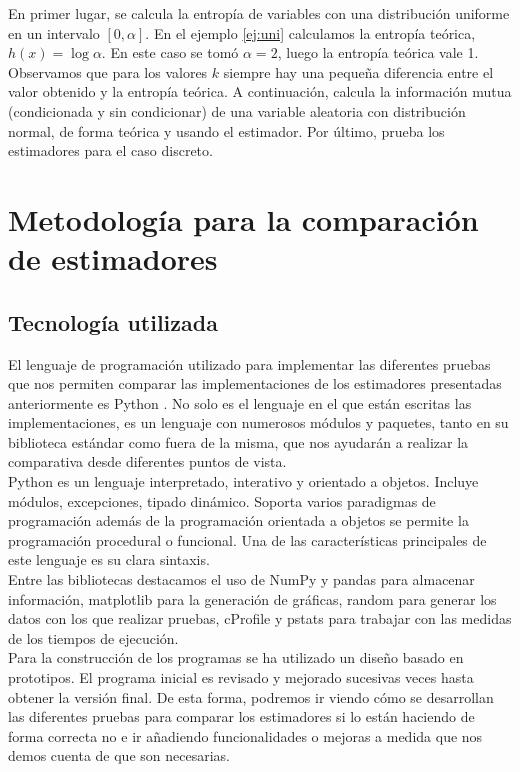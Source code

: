 \documentclass[12pt,a4paper]{report} %
\theoremstyle{definition}
\begin{document}
En primer lugar, se calcula la entropía de variables con una distribución uniforme en un intervalo $[0,\alpha]$. En el ejemplo \ref{ej:uni} calculamos la entropía teórica, $h(x) = \log \alpha$. En este caso se tomó $\alpha = 2$, luego la entropía teórica vale 1. Observamos que para los valores $k$ siempre hay una pequeña diferencia entre el valor obtenido y la entropía teórica. A continuación, calcula la información mutua (condicionada y sin condicionar) de una variable aleatoria con distribución normal, de forma teórica y usando el estimador. Por último, prueba los estimadores para el caso discreto. 


\chapter{Metodología para la comparación de estimadores}
\section{Tecnología utilizada}

El lenguaje de programación utilizado para implementar las diferentes pruebas que nos permiten comparar las implementaciones de los estimadores presentadas anteriormente es Python \cite{python}. No solo es el lenguaje en el que están escritas las implementaciones, es un lenguaje con numerosos módulos y paquetes, tanto en su biblioteca estándar como fuera de la misma, que nos ayudarán a realizar la comparativa desde diferentes puntos de vista.\\

Python es un lenguaje interpretado, interativo y orientado a objetos. Incluye módulos, excepciones, tipado dinámico. Soporta varios paradigmas de programación además de la programación orientada a objetos se permite la programación procedural o funcional. Una de las características principales de este lenguaje es su clara sintaxis.\\

Entre las bibliotecas destacamos el uso de NumPy \cite{numpy} y pandas \cite{pandas} para almacenar información, matplotlib \cite{matplotlib} para la generación de gráficas, random \cite{random} para generar los datos con los que realizar pruebas, cProfile y pstats \cite{profilers} para trabajar con las medidas de los tiempos de ejecución.\\

Para la construcción de los programas se ha utilizado un diseño basado en prototipos. El programa inicial es revisado y mejorado sucesivas veces hasta obtener la versión final. De esta forma, podremos ir viendo cómo se desarrollan las diferentes pruebas para comparar los estimadores si lo están haciendo de forma correcta no e ir añadiendo funcionalidades o mejoras a medida que nos demos cuenta de que son necesarias.\\
\end{document}
